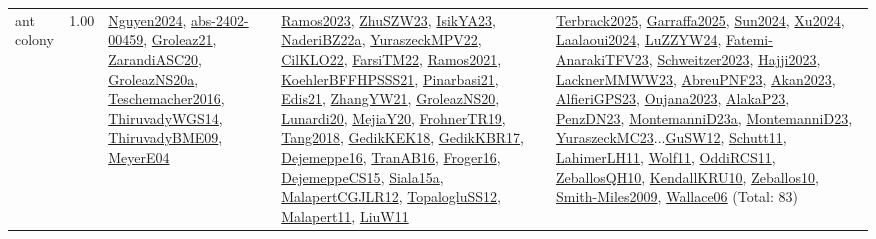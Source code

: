 {\begin{longtable}{p{3cm}r>{\raggedright\arraybackslash}p{6cm}>{\raggedright\arraybackslash}p{6cm}>{\raggedright\arraybackslash}p{8cm}}
\index{ant colony}\index{Algorithms!ant colony}ant colony &  1.00 & \hyperref[detail:Nguyen2024]{Nguyen2024}, \hyperref[detail:abs-2402-00459]{abs-2402-00459}, \hyperref[detail:Groleaz21]{Groleaz21}, \hyperref[detail:ZarandiASC20]{ZarandiASC20}, \hyperref[detail:GroleazNS20a]{GroleazNS20a}, \hyperref[detail:Teschemacher2016]{Teschemacher2016}, \hyperref[detail:ThiruvadyWGS14]{ThiruvadyWGS14}, \hyperref[detail:ThiruvadyBME09]{ThiruvadyBME09}, \hyperref[detail:MeyerE04]{MeyerE04} & \hyperref[detail:Ramos2023]{Ramos2023}, \hyperref[detail:ZhuSZW23]{ZhuSZW23}, \hyperref[detail:IsikYA23]{IsikYA23}, \hyperref[detail:NaderiBZ22a]{NaderiBZ22a}, \hyperref[detail:YuraszeckMPV22]{YuraszeckMPV22}, \hyperref[detail:CilKLO22]{CilKLO22}, \hyperref[detail:FarsiTM22]{FarsiTM22}, \hyperref[detail:Ramos2021]{Ramos2021}, \hyperref[detail:KoehlerBFFHPSSS21]{KoehlerBFFHPSSS21}, \hyperref[detail:Pinarbasi21]{Pinarbasi21}, \hyperref[detail:Edis21]{Edis21}, \hyperref[detail:ZhangYW21]{ZhangYW21}, \hyperref[detail:GroleazNS20]{GroleazNS20}, \hyperref[detail:Lunardi20]{Lunardi20}, \hyperref[detail:MejiaY20]{MejiaY20}, \hyperref[detail:FrohnerTR19]{FrohnerTR19}, \hyperref[detail:Tang2018]{Tang2018}, \hyperref[detail:GedikKEK18]{GedikKEK18}, \hyperref[detail:GedikKBR17]{GedikKBR17}, \hyperref[detail:Dejemeppe16]{Dejemeppe16}, \hyperref[detail:TranAB16]{TranAB16}, \hyperref[detail:Froger16]{Froger16}, \hyperref[detail:DejemeppeCS15]{DejemeppeCS15}, \hyperref[detail:Siala15a]{Siala15a}, \hyperref[detail:MalapertCGJLR12]{MalapertCGJLR12}, \hyperref[detail:TopalogluSS12]{TopalogluSS12}, \hyperref[detail:Malapert11]{Malapert11}, \hyperref[detail:LiuW11]{LiuW11} & \hyperref[detail:Terbrack2025]{Terbrack2025}, \hyperref[detail:Garraffa2025]{Garraffa2025}, \hyperref[detail:Sun2024]{Sun2024}, \hyperref[detail:Xu2024]{Xu2024}, \hyperref[detail:Laalaoui2024]{Laalaoui2024}, \hyperref[detail:LuZZYW24]{LuZZYW24}, \hyperref[detail:Fatemi-AnarakiTFV23]{Fatemi-AnarakiTFV23}, \hyperref[detail:Schweitzer2023]{Schweitzer2023}, \hyperref[detail:Hajji2023]{Hajji2023}, \hyperref[detail:LacknerMMWW23]{LacknerMMWW23}, \hyperref[detail:AbreuPNF23]{AbreuPNF23}, \hyperref[detail:Akan2023]{Akan2023}, \hyperref[detail:AlfieriGPS23]{AlfieriGPS23}, \hyperref[detail:Oujana2023]{Oujana2023}, \hyperref[detail:AlakaP23]{AlakaP23}, \hyperref[detail:PenzDN23]{PenzDN23}, \hyperref[detail:MontemanniD23a]{MontemanniD23a}, \hyperref[detail:MontemanniD23]{MontemanniD23}, \hyperref[detail:YuraszeckMC23]{YuraszeckMC23}...\hyperref[detail:GuSW12]{GuSW12}, \hyperref[detail:Schutt11]{Schutt11}, \hyperref[detail:LahimerLH11]{LahimerLH11}, \hyperref[detail:Wolf11]{Wolf11}, \hyperref[detail:OddiRCS11]{OddiRCS11}, \hyperref[detail:ZeballosQH10]{ZeballosQH10}, \hyperref[detail:KendallKRU10]{KendallKRU10}, \hyperref[detail:Zeballos10]{Zeballos10}, \hyperref[detail:Smith-Miles2009]{Smith-Miles2009}, \hyperref[detail:Wallace06]{Wallace06} (Total: 83)\\

\end{longtable}}

